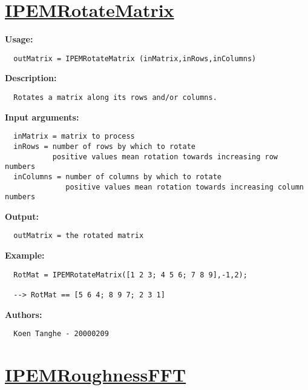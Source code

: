 \newpage
\section*{\hyperlink{Concepts:IPEMRotateMatrix}{IPEMRotateMatrix}}
\hypertarget{FuncRef:IPEMRotateMatrix}{}

\textbf{Usage:}
\begin{verbatim}  outMatrix = IPEMRotateMatrix (inMatrix,inRows,inColumns)

\end{verbatim}
\textbf{Description:}
\begin{verbatim}  Rotates a matrix along its rows and/or columns.

\end{verbatim}
\textbf{Input arguments:}
\begin{verbatim}  inMatrix = matrix to process
  inRows = number of rows by which to rotate
           positive values mean rotation towards increasing row numbers
  inColumns = number of columns by which to rotate
              positive values mean rotation towards increasing column numbers

\end{verbatim}
\textbf{Output:}
\begin{verbatim}  outMatrix = the rotated matrix

\end{verbatim}
\textbf{Example:}
\begin{verbatim}  RotMat = IPEMRotateMatrix([1 2 3; 4 5 6; 7 8 9],-1,2);

  --> RotMat == [5 6 4; 8 9 7; 2 3 1]

\end{verbatim}
\textbf{Authors:}
\begin{verbatim}  Koen Tanghe - 20000209
\end{verbatim}


\newpage
\section*{\hyperlink{Concepts:IPEMRoughnessFFT}{IPEMRoughnessFFT}}
\hypertarget{FuncRef:IPEMRoughnessFFT}{}


